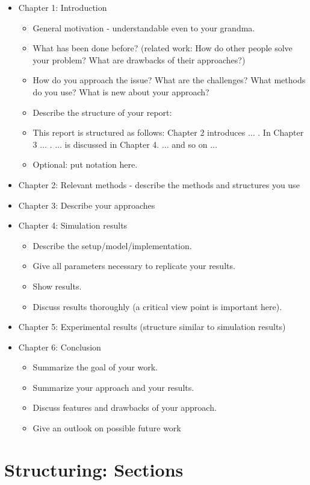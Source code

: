 \begin{itemize}
	\item Chapter 1: Introduction
	\begin{itemize}
			\item General motivation - understandable even to your grandma.
			\item What has been done before? (related work: How do other people solve your problem? What are drawbacks of their approaches?)
			\item How do you approach the issue? What are the challenges? What methods do you use? What is new about your approach?
			\item Describe the structure of your report:
			\item This report is structured as follows: Chapter 2 introduces $\ldots$ . In Chapter 3 $\ldots$ . $\ldots$ is discussed in Chapter 4. $\ldots$ and so on $\ldots$
			\item Optional: put notation here.
	\end{itemize}
	\item Chapter 2: Relevant methods - describe the methods and structures you use
	\item Chapter 3: Describe your approaches
	\item Chapter 4: Simulation results
	\begin{itemize}
			\item Describe the setup/model/implementation.
			\item Give all parameters necessary to replicate your results.
			\item Show results.
			\item Discuss results thoroughly (a critical view point is important here).		
	\end{itemize}
	\item Chapter 5: Experimental results (structure similar to simulation results)
	\item Chapter 6: Conclusion
	\begin{itemize}
			\item Summarize the goal of your work.
			\item Summarize your approach and your results.
			\item Discuss features and drawbacks of your approach.
			\item Give an outlook on possible future work	
	\end{itemize}
\end{itemize}

\section{Structuring: Sections}

